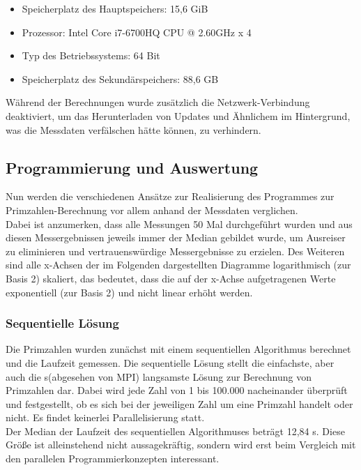			\begin{itemize}
				\item Speicherplatz des Hauptspeichers: 15,6 GiB
				\item Prozessor: Intel Core i7-6700HQ CPU @ 2.60GHz x 4
				\item Typ des Betriebssystems: 64 Bit
				\item Speicherplatz des Sekundärspeichers: 88,6 GB
			\end{itemize}
		
			Während der Berechnungen wurde zusätzlich die Netzwerk-Verbindung deaktiviert, um das Herunterladen von Updates und Ähnlichem im Hintergrund, was die Messdaten verfälschen hätte können, zu verhindern.
		
		\subsection{Programmierung und Auswertung}
		
			Nun werden die verschiedenen Ansätze zur Realisierung des Programmes zur Primzahlen-Berechnung vor allem anhand der Messdaten verglichen.\\
			Dabei ist anzumerken, dass alle Messungen 50 Mal durchgeführt wurden und aus diesen Messergebnissen jeweils immer der Median gebildet wurde, um Ausreiser zu eliminieren und vertrauenswürdige Messergebnisse zu erzielen. Des Weiteren sind alle x-Achsen der im Folgenden dargestellten Diagramme logarithmisch (zur Basis 2) skaliert, das bedeutet, dass die auf der x-Achse aufgetragenen Werte exponentiell (zur Basis 2) und nicht linear erhöht werden.
		
			\subsubsection{Sequentielle Lösung}
			
				Die Primzahlen wurden zunächst mit einem sequentiellen Algorithmus berechnet und die Laufzeit gemessen. Die sequentielle Lösung stellt die einfachste, aber auch die s(abgesehen von MPI) langsamste Lösung zur Berechnung von Primzahlen dar. Dabei wird jede Zahl von 1 bis 100.000 nacheinander überprüft und festgestellt, ob es sich bei der jeweiligen Zahl um eine Primzahl handelt oder nicht. Es findet keinerlei Parallelisierung statt.\\
				Der Median der Laufzeit des sequentiellen Algorithmuses beträgt 12,84 s. Diese Größe ist alleinstehend nicht aussagekräftig, sondern wird erst beim Vergleich mit den parallelen Programmierkonzepten interessant.
			
